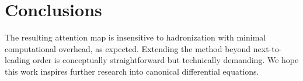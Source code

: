\section{Conclusions}\label{sec:conclusions}

The resulting attention map is insensitive to hadronization with minimal
computational overhead, as expected. Extending the method beyond
next-to-leading order is conceptually straightforward but technically
demanding. We hope this work inspires further research into canonical
differential equations.

